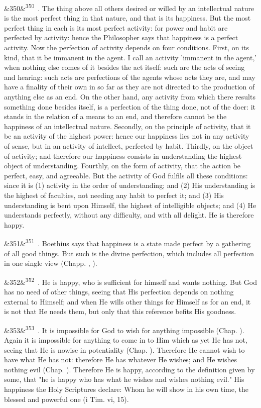 \documentclass[12pt]{article}
\newcommand{\para}[1][]{\par\noindent\ifx&#1&\else\textsuperscript{\footnotesize #1}~\fi}
\begin{document}
\para[350] 2. The thing above all others desired or willed by an intellectual nature is the most perfect thing in that nature, and that is its happiness. But the most perfect thing in each is its most perfect activity: for power and habit are perfected by activity: hence the Philosopher says that happiness is a perfect activity. Now the perfection of activity depends on four conditions. First, on its kind, that it be immanent in the agent. I call an activity 'immanent in the agent,' when nothing else comes of it besides the act itself: such are the acts of seeing and hearing: such acts are perfections of the agents whose acts they are, and may have a finality of their own in so far as they are not directed to the production of anything else as an end. On the other hand, any activity from which there results something done besides itself, is a perfection of the thing done, not of the doer: it stands in the relation of a means to an end, and therefore cannot be the happiness of an intellectual nature. Secondly, on the principle of activity, that it be an activity of the highest power: hence our happiness lies not in any activity of sense, but in an activity of intellect, perfected by habit. Thirdly, on the object of activity; and therefore our happiness consists in understanding the highest object of understanding. Fourthly, on the form of activity, that the action be perfect, easy, and agreeable. But the activity of God fulfils all these conditions: since it is (1) activity in the order of understanding; and (2) His understanding is the highest of faculties, not needing any habit to perfect it; and (3) His understanding is bent upon Himself, the highest of intelligible objects; and (4) He understands perfectly, without any difficulty, and with all delight. He is therefore happy.

\para[351] 3. Boethius says that happiness is a state made perfect by a gathering of all good things. But such is the divine perfection, which includes all perfection in one single view (Chapp. , ).

\para[352] 4. He is happy, who is sufficient for himself and wants nothing. But God has no need of other things, seeing that His perfection depends on nothing external to Himself; and when He wills other things for Himself as for an end, it is not that He needs them, but only that this reference befits His goodness.

\para[353] 5. It is impossible for God to wish for anything impossible (Chap. ). Again it is impossible for anything to come in to Him which as yet He has not, seeing that He is nowise in potentiality (Chap. ). Therefore He cannot wish to have what He has not: therefore He has whatever He wishes; and He wishes nothing evil (Chap. ). Therefore He is happy, according to the definition given by some, that "he is happy who has what he wishes and wishes nothing evil." His happiness the Holy Scriptures declare: Whom he will show in his own time, the blessed and powerful one (i Tim. vi, 15).
\end{document}
